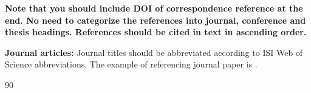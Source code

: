 \documentclass{article} %
\begin{document}
\begin{multicols}{2}
\textbf{Note that you should include DOI of correspondence reference at the end. No need to categorize the references into journal, conference and thesis headings. References should be cited in text in ascending order.}
\newline

\footnotesize{

\noindent \textbf{Journal articles:} Journal titles should be abbreviated according to ISI Web of Science abbreviations. The example of referencing journal paper is \cite{journal1}. 
\begin{thebibliography}{99}


\end{thebibliography}{90}
\noindent

} 

\end{multicols}
\end{document}
